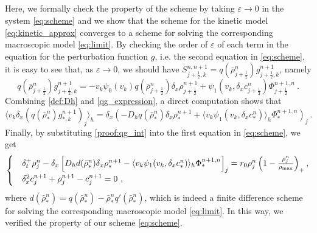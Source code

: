 \documentclass[review,onefignum,onetabnum]{siamart220329}
\begin{document}
\subsection{{\color{red}{Asymptotic preservation property}}}
{Here, we formally check the {\color{red}{asymptotic preservation}} property of the scheme by taking $\varepsilon \to 0$ in the system \cref{eq:scheme} and we show that the scheme for the kinetic model \cref{eq:kinetic_approx} converges to a scheme for solving the corresponding macroscopic model \cref{eq:limit}}. 
By checking the order of $\varepsilon$ of each term in the equation for the perturbation function $g$, i.e. the second equation in \cref{eq:scheme}, it is easy to see that, as $\varepsilon\to 0$, we should have  $S_{j+\frac12,k}^{n,n+1} = q(\bar{\rho}_{j+\frac12}^n) g_{j+\frac12,k}^{n+1}$, namely
\begin{equation} \label{qg_expression}
    q(\bar{\rho}_{j+\frac12}^n) g_{j+\frac12,k}^{n+1} = -v_k\psi_{0}(v_k)q(\bar{\rho}_{j+\frac12}^n)  \delta_x \rho_{j+\frac12}^{n+1} + \psi_{1}(v_k, \delta_x c_{j+\frac12}^n)
    \Phi^{n+1,n}_{j+\frac12}\ .    
\end{equation}
Combining \cref{def:Dh} and \cref{qg_expression}, a direct computation shows that
\begin{equation}\label{proof:qg_int}
    \langle v_k \delta_x (q(\bar{\rho}_*^n)g_{*,k}^{n+1})_j\rangle_h = 
    \delta_x(-D_h q(
    \bar{\rho}_*^n)\delta_x\rho_*^{n+1} + \langle v_k \psi_1(v_k, \delta_x c_*^n)\rangle_h \Phi_*^{n+1,n})_j\ .
\end{equation}
Finally, by substituting \cref{proof:qg_int} into the first equation in \cref{eq:scheme}, we get  
\begin{equation}\label{scheme:limit}
\begin{cases}
    &\delta_t^+ \rho_j^n 
     - \delta_x\left[D_h d(\bar{\rho}_*^n)\delta_x \rho_*^{n+1} - \langle v_k \psi_1(v_k, \delta_x c_*^n)\rangle_h \Phi_*^{n+1,n}\right]_j 
    = r_0 \rho_j^{n}\left(1 - \frac{\rho_j^n}{\rho_{\rm max}}\right)_+,\\
    &\delta_x^2 c_j^{n+1} + \rho_j^{n+1} - c_j^{n+1}=0\ ,
\end{cases}
\end{equation}
where $d(\bar{\rho}_*^n) = q(\bar{\rho}_*^n)-\bar{\rho}_*^n q'(\bar{\rho}_*^n)$, 
which is indeed a finite difference scheme for solving the corresponding macroscopic model \cref{eq:limit}. 
In this way, we verified the {\color{red}{asymptotic preservation}} property of our scheme \cref{eq:scheme}. 
\end{document}
